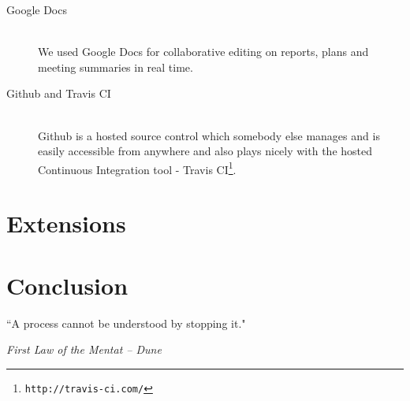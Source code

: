 \documentclass[11pt, a4paper]{article}
\newlength\longest
\begin{document}
\begin{description}
\item[Google Docs] \hfill \\
We used Google Docs for collaborative editing on reports, plans and meeting summaries in real time.
  
\item[Github and Travis CI] \hfill \\
Github is a hosted source control which somebody else manages and is easily accessible from anywhere and also plays nicely with the hosted Continuous Integration tool - Travis CI\footnote{\tt{http://travis-ci.com/}}.
\end{description}
\section{Extensions}
\section{Conclusion}

\clearpage
\thispagestyle{empty}
\null\vfill
\begin{center}
\settowidth{}
\parbox{\longest}{%
  \raggedright{%
  ``A process cannot be understood by stopping it." \\
  }   
  \raggedright{\emph{First Law of the Mentat -- Dune}}\par%
}
\end{center}
\vfill\vfill
\clearpage
\end{document}
